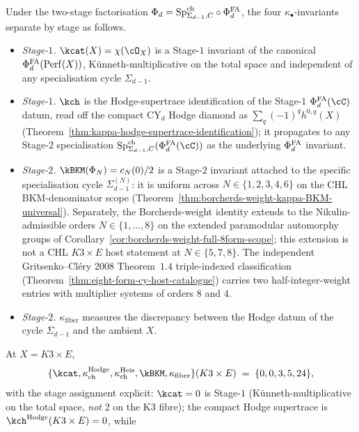 \begin{remark}
\label{rem:four-kappa-stage-assignment-cy-d-strat}
Under the two-stage factorisation
$\Phi_d = \mathrm{Sp}^{\mathrm{ch}}_{\Sigma_{d-1}, C} \circ \Phi^{\mathrm{FA}}_d$, the four
$\kappa_\bullet$-invariants separate by stage as follows.
\begin{itemize}
\item \emph{Stage-$1$.} $\kcat(X) = \chi(\cO_X)$ is a Stage-$1$ invariant
 of the canonical $\Phi^{\mathrm{FA}}_d(\mathrm{Perf}(X))$, K\"unneth-multiplicative
 on the total space and independent of any specialisation cycle
 $\Sigma_{d-1}$.
\item \emph{Stage-$1$.} $\kch$ is the Hodge-supertrace identification
 of the Stage-$1$ $\PhiFA_d(\cC)$ datum, read off the compact CY$_d$
 Hodge diamond as $\sum_q (-1)^q h^{0,q}(X)$
 (Theorem~\ref{thm:kappa-hodge-supertrace-identification}); it
 propagates to any Stage-$2$ specialisation
 $\SpCh_{\Sigma_{d-1}, C}(\PhiFA_d(\cC))$ as the underlying $\Phi^{\mathrm{FA}}_d$
 invariant.
\item \emph{Stage-$2$.} $\kBKM(\Phi_N) = c_N(0)/2$ is a Stage-$2$
 invariant attached to the specific specialisation cycle
 $\Sigma_{d-1}^{(N)}$: it is uniform across $N \in \{1, 2, 3, 4, 6\}$ on
 the CHL BKM-denominator scope
 (Theorem~\ref{thm:borcherds-weight-kappa-BKM-universal}). Separately,
 the Borcherds-weight identity extends to the Nikulin-admissible orders
 $N \in \{1,\ldots,8\}$ on the extended paramodular automorphy groups
 of Corollary~\ref{cor:borcherds-weight-full-8form-scope}; this
 extension is not a CHL $K3\times E$ host statement at
 $N\in\{5,7,8\}$. The
 independent Gritsenko--Cl\'ery 2008 Theorem~$1.4$ triple-indexed
 classification (Theorem~\ref{thm:eight-form-cy-host-catalogue})
 carries two half-integer-weight entries with multiplier systems of
 orders $8$ and $4$.
\item \emph{Stage-$2$.} $\kappa_{\mathrm{fiber}}$ measures the
 discrepancy between the Hodge datum of the cycle $\Sigma_{d-1}$ and
 the ambient $X$.
\end{itemize}
At $X = K3 \times E$,
\[
 \{\kcat, \kappa_{\mathrm{ch}}^{\mathrm{Hodge}}, \kappa_{\mathrm{ch}}^{\mathrm{Heis}}, \kBKM, \kappa_{\mathrm{fiber}}\}(K3 \times E)
 \;=\; \{0, 0, 3, 5, 24\},
\]
with the stage assignment explicit: $\kcat = 0$ is Stage-$1$
(K\"unneth-multiplicative on the total space, \emph{not} $2$ on the K3
fibre); the compact Hodge supertrace is
\(\kch^{\mathrm{Hodge}}(K3\times E)=0\), while

\end{remark}
